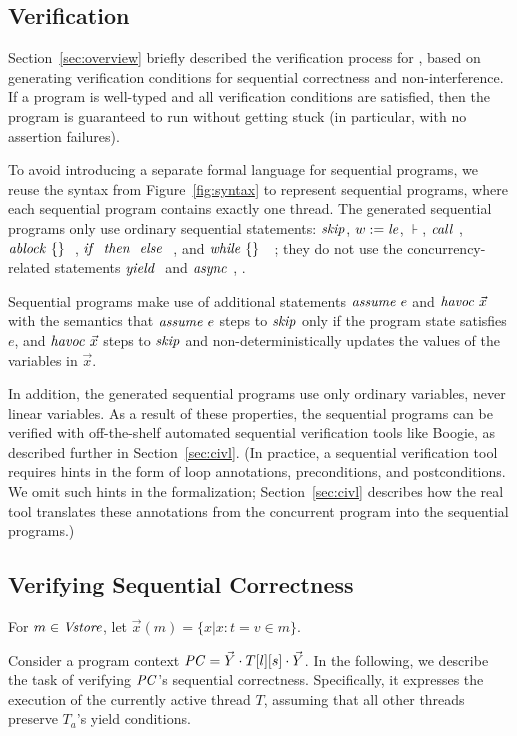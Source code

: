 \subsection{Verification}
\label{sec:verification}

Section~\ref{sec:overview} briefly described the verification process for \civl, based on generating verification conditions for sequential correctness and non-interference.
If a program is well-typed and all verification conditions are satisfied, then the program is guaranteed to run without getting stuck (in particular, with no assertion failures).

To avoid introducing a separate formal language for sequential programs, we reuse the syntax from Figure~\ref{fig:syntax} to represent sequential programs, where each sequential program contains exactly one thread.
The generated sequential programs only use ordinary sequential statements:
$\mathit{skip}$, $w := \mathit{le}$, $\assert{}$, $\mathit{call}\ $, $\mathit{ablock}\ {\{\}}\ {}\ $, ${\mathit{if}\ {}\ }{\mathit{then}\ {}\ }{\mathit{else}\ {}\ }$, and $\mathit{while}\ \{{}\}\ {{}\ } {{}\ }$;
they do not use the concurrency-related statements $\yield$ and $\mathit{async}\ $, .

Sequential programs make use of additional statements  $\mathit{assume}\ e$ and $\mathit{havoc}\ \vec{x}$ with the semantics that $\mathit{assume}\ e$ steps to $\mathit{skip}$ only if the program state satisfies $e$, and $\mathit{havoc}\ \vec{x}$ steps to $\mathit{skip}$ and non-deterministically updates the values of the variables in $\vec{x}$. 

In addition, the generated sequential programs use only ordinary variables, never linear variables.
As a result of these properties, the sequential programs can be verified with off-the-shelf automated sequential verification tools like Boogie, as described further in Section~\ref{sec:civl}.
(In practice, a sequential verification tool requires hints in the form of loop annotations, preconditions, and postconditions.
We omit such hints in the formalization; Section~\ref{sec:civl} describes how the real \civl tool translates these annotations from the concurrent program into the sequential programs.)


\subsection{Verifying Sequential Correctness}
For $m \in \mathit{Vstore}$, let $ \vec{x}(m) = \{ x  |   x : t = v \in m \} $. 

Consider a program context $\mathit{PC} = \vec{Y} \cdot T[l][s] \cdot \vec{Y}$. In the following, we describe the task of verifying $\mathit{PC}$'s sequential correctness. Specifically, it expresses the execution of the currently active thread $T$, assuming that all other threads preserve $T_a$'s yield conditions.

